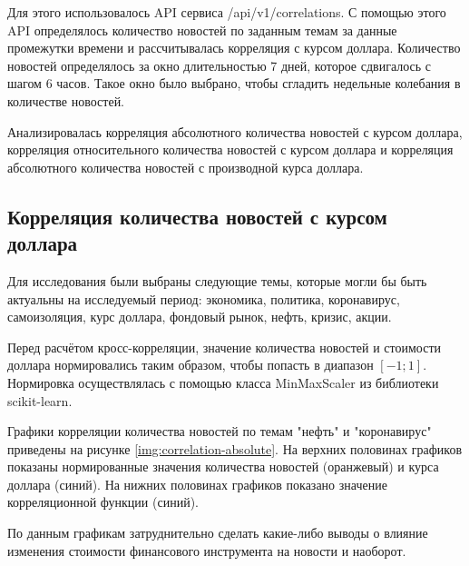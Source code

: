 Для этого использовалось API сервиса /api/v1/correlations. С помощью этого API определялось количество новостей по заданным темам за данные промежутки времени и рассчитывалась корреляция с курсом доллара. Количество новостей определялось за окно длительностью 7 дней, которое сдвигалось с шагом 6 часов. Такое окно было выбрано, чтобы сгладить недельные колебания в количестве новостей.

Анализировалась корреляция абсолютного количества новостей с курсом доллара, корреляция относительного количества новостей с курсом доллара и корреляция абсолютного количества новостей с производной курса доллара.

\subsection{Корреляция количества новостей с курсом доллара}

Для исследования были выбраны следующие темы, которые могли бы быть актуальны на исследуемый период: экономика, политика, коронавирус, самоизоляция, курс доллара, фондовый рынок, нефть, кризис, акции.

Перед расчётом кросс-корреляции, значение количества новостей и стоимости доллара нормировались таким образом, чтобы попасть в диапазон $[-1; 1]$. Нормировка осуществлялась с помощью класса MinMaxScaler из библиотеки scikit-learn.

Графики корреляции количества новостей по темам "нефть" и "коронавирус" приведены на рисунке \ref{img:correlation-absolute}. На верхних половинах графиков показаны нормированные значения количества новостей (оранжевый) и курса доллара (синий). На нижних половинах графиков показано значение корреляционной функции (синий).

По данным графикам затруднительно сделать какие-либо выводы о влияние изменения стоимости финансового инструмента на новости и наоборот.

